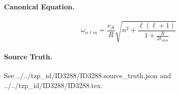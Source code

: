 \paragraph{Canonical Equation.}
\[
\begin{equation} \omega_{n \ell m} = \frac{v_A}{R} \sqrt{n^2 + \frac{ \ell( \ell+1)}{1 + \frac{R}{2 \delta_{skin}}}} \end{equation}
\]

\paragraph{Source Truth.}
See ../../tzp\_id/ID3288/ID3288.source\_truth.json and ../../tzp\_id/ID3288/ID3288.tex.
